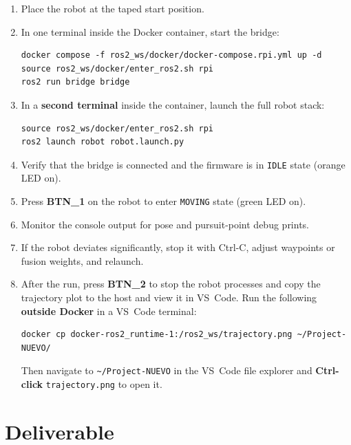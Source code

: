 \documentclass[12pt,letterpaper]{article}
\begin{document}
\begin{enumerate}
  \item Place the robot at the taped start position.
  \item In one terminal inside the Docker container, start the bridge:
\begin{lstlisting}[style=bash]
docker compose -f ros2_ws/docker/docker-compose.rpi.yml up -d
source ros2_ws/docker/enter_ros2.sh rpi
ros2 run bridge bridge
\end{lstlisting}
  \item In a \textbf{second terminal} inside the container, launch the full
        robot stack:
\begin{lstlisting}[style=bash]
source ros2_ws/docker/enter_ros2.sh rpi
ros2 launch robot robot.launch.py
\end{lstlisting}
  \item Verify that the bridge is connected and the firmware is in
        \texttt{IDLE} state (orange LED on).
  \item Press \textbf{BTN\_1} on the robot to enter \texttt{MOVING} state
        (green LED on).
  \item Monitor the console output for pose and pursuit-point debug prints.
  \item If the robot deviates significantly, stop it with Ctrl-C, adjust
        waypoints or fusion weights, and relaunch.
  \item After the run, press \textbf{BTN\_2} to stop the robot processes and copy the trajectory plot to the host and view it in
        VS~Code.  Run the following \textbf{outside Docker} in a VS~Code
        terminal:
\begin{lstlisting}[style=bash]
docker cp docker-ros2_runtime-1:/ros2_ws/trajectory.png ~/Project-NUEVO/
\end{lstlisting}
        Then navigate to \texttt{\textasciitilde/Project-NUEVO} in the
        VS~Code file explorer and \textbf{Ctrl-click} \texttt{trajectory.png}
        to open it.
\end{enumerate}

\newpage

\section{Deliverable}
\end{document}
